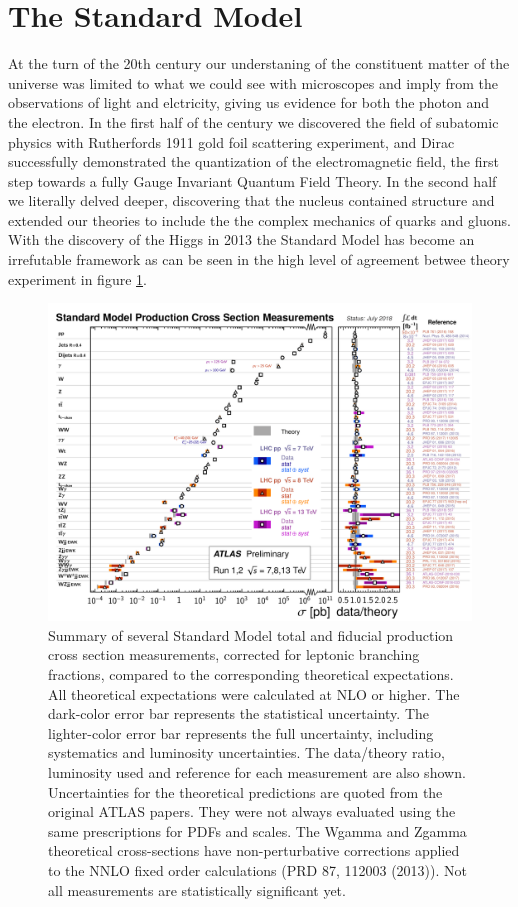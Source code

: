 \section{The Standard Model} \label{sec:theory:standardmodel}

At the turn of the 20th century our understaning of the constituent matter of
the universe was limited to what we could see with microscopes and imply from
the observations of light and elctricity, giving us evidence for both the photon
and the electron.  In the first half of the century we discovered the field of
subatomic physics with Rutherfords 1911 gold foil scattering experiment, and
Dirac successfully demonstrated the quantization of the electromagnetic field,
the first step towards a fully Gauge Invariant Quantum Field Theory.
In the second half we literally delved deeper, discovering that the nucleus
contained structure and extended our theories to include the the complex
mechanics of quarks and gluons.  With the discovery of the Higgs in 2013 the
Standard Model has become an irrefutable framework as can be seen in the high
level of agreement betwee theory experiment in figure
\ref{fig:xsection_measurements}.

\begin{figure}[!htbp]
  \begin{center}
    \includegraphics[width=0.8\linewidth]{figures/theory/xsection_measurements.pdf}
    \caption{ Summary of several Standard Model total and fiducial production cross section measurements, corrected for leptonic branching fractions, compared to the corresponding theoretical expectations. All theoretical expectations were calculated at NLO or higher. The dark-color error bar represents the statistical uncertainty. The lighter-color error bar represents the full uncertainty, including systematics and luminosity uncertainties. The data/theory ratio, luminosity used and reference for each measurement are also shown. Uncertainties for the theoretical predictions are quoted from the original ATLAS papers. They were not always evaluated using the same prescriptions for PDFs and scales. The Wgamma and Zgamma theoretical cross-sections have non-perturbative corrections applied to the NNLO fixed order calculations (PRD 87, 112003 (2013)). Not all measurements are statistically significant yet.}
    \label{fig:xsection_measurements}
  \end{center}
\end{figure}

